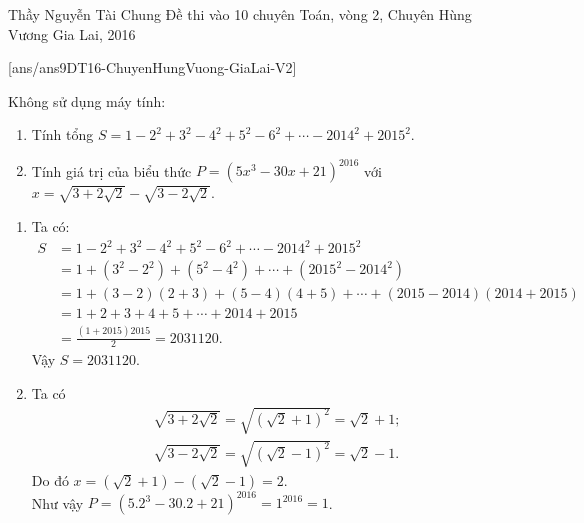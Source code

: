\begin{name}
{Thầy  Nguyễn Tài Chung}
{Đề thi vào 10 chuyên Toán, vòng 2, Chuyên Hùng Vương Gia Lai, 2016}
\end{name}
\setcounter{ex}{0}
[ans/ans9DT16-ChuyenHungVuong-GiaLai-V2]
\begin{ex}%
Không sử dụng máy tính:
    \begin{enumerate}
        \item Tính tổng  $S = 1 - 2^2 + 3^2 - 4^2 + 5^2 - 6^2 + \cdots - 2014^2 + 2015^2$.
        \item Tính giá trị của biểu thức  $P=\left( 5x^3-30x+21 \right)^{2016}$ với  $x=\sqrt{3+2\sqrt 2}-\sqrt{3-2\sqrt 2}$.
    \end{enumerate}
\loigiai
    {
    \begin{enumerate}
        \item Ta có:
        {\allowdisplaybreaks
        	\begin{align*}
        	S& = 1 - 2^2 + 3^2 - 4^2 + 5^2 - 6^2 + \cdots - 2014^2 + 2015^2\\
        	&= 1 + \left( {3^2} - {2^2} \right) + \left( {5^2} - {4^2} \right) + \cdots+ \left( {2015}^2 - {2014}^2\right)\\
        	&= 1 + \left( 3 - 2 \right)\left( 2 + 3 \right) + \left( 5 - 4 \right)\left( 4 + 5 \right) + \cdots + \left( 2015 - 2014 \right)\left( 2014 + 2015 \right)\\
        	&= 1 + 2 + 3 + 4 + 5 + \cdots + 2014 + 2015\\
        	& = \frac{\left( {1 + 2015} \right)2015}{2} = 2031120.
        	\end{align*}}Vậy $S=2031120$.
        \item Ta có 
        {\allowdisplaybreaks
        \begin{align*}
        &\sqrt{3+2\sqrt 2}=\sqrt{\left( \sqrt{2}+1 \right)^2}=\sqrt{2}+1;\\
        &\sqrt{3-2\sqrt 2}=\sqrt{\left( \sqrt{2}-1 \right)^2}=\sqrt{2}-1.
        \end{align*}}Do đó  $x=\left( \sqrt{2}+1 \right)-\left( \sqrt{2}-1 \right)=2$.\\
       Như vậy $P=\left( 5.2^3-30.2+21 \right)^{2016}=1^{2016}=1$.        
    \end{enumerate}
    }
\end{ex}

